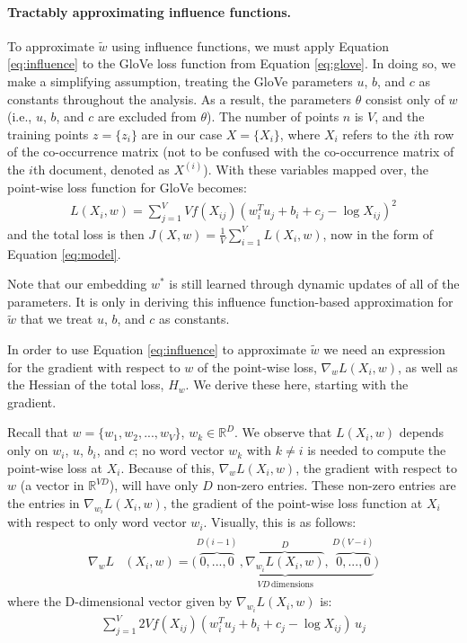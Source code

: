 \documentclass{article}
\newcommand{\xhdr}[1]{\paragraph*{\bf {#1.}}}
\newcommand{\Real}{\mathbb{R}}
\begin{document}
\xhdr{Tractably approximating influence functions}
To approximate $\tilde{w}$ using influence functions, we must apply Equation \eqref{eq:influence} to the GloVe loss function from Equation \eqref{eq:glove}.
In doing so, we make a simplifying assumption, treating the  GloVe parameters $u$, $b$, and $c$ as constants throughout the analysis.
As a result, the parameters $\theta$ consist only of $w$ (i.e., $u$, $b$, and $c$ are excluded from $\theta$).
The number of points $n$ is $V$, and the training points $z = \{ z_i\}$ are in our case $X = \{ X_{i}\}$, where $X_i$ refers to the $i$th row of the co-occurrence matrix (not to be confused with the co-occurrence matrix of the $i$th document, denoted as $X^{(i)}$). With these variables mapped over, the point-wise loss function for GloVe becomes:
\begin{align*}
L(X_i, w) =  \sum_{j=1}^V V f(X_{ij}) (w_i ^T u_j + b_i + c_j - \log X_{ij})^2
\end{align*}
and the total loss is then $J(X, w) = \frac{1}{V}\sum_{i=1}^{V}L(X_i, w)$, now in the form of Equation \eqref{eq:model}.

Note that our embedding $w^*$ is still learned through dynamic updates of all of the parameters. It is only in deriving this influence function-based approximation for $\tilde{w}$ that we treat $u$, $b$, and $c$ as constants.

In order to use Equation \eqref{eq:influence} to approximate $\tilde{w}$ we need an expression for the gradient with respect to $w$ of the point-wise loss, $\nabla_w L(X_i, w)$, as well as the Hessian of the total loss, $H_w$. We derive these here, starting with the gradient.

Recall that $w=\{w_1, w_2, ... ,w_V\}$, $w_k \in \Real^D$.
We observe that $L(X_i, w)$ depends only on $w_i$, $u$, $b_i$, and $c$; no word vector $w_k$ with $k \neq i$ is needed to compute the point-wise loss at $X_i$. 
Because of this, $\nabla_w L(X_i, w)$, the gradient with respect to $w$ (a vector in $\Real^{VD}$), will have only $D$ non-zero entries.
These non-zero entries are the entries in $\nabla_{w_i} L(X_i, w)$, the gradient of the point-wise loss function at $X_i$ with respect to only word vector $w_i$. Visually, this is as follows:
\begin{align}
\label{eg:glove_grad}
\begin{split}
\nabla_w L&(X_i, w) = \bigg(\underbrace{\overbrace{0, ..., 0}^{D(i-1)} \,, \overbrace{\nabla_{w_i}L(X_i, w)}^{D}, \, \overbrace{0, ..., 0}^{D(V-i)}}_{VD\, \text{dimensions}} \bigg)
\end{split}
\end{align}
where the D-dimensional vector given by $\nabla_{w_i}L(X_i, w)$ is:
\begin{align*}
\sum_{j=1}^V 2V f(X_{ij}) (w_i ^T u_j + b_i + c_j - \log X_{ij})\,u_j
\end{align*}
\end{document}
